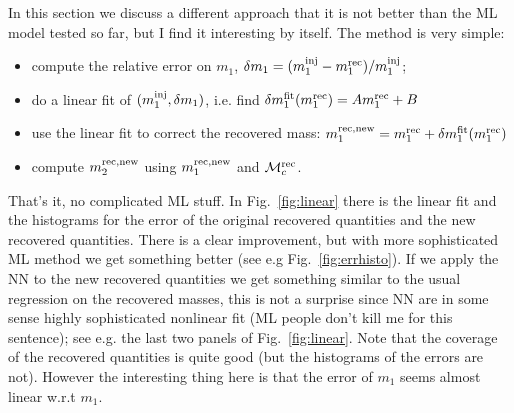 \documentclass[prd,aps,twocolumn,a4paper,showkeys,nofootinbib]{revtex4-1}
\def\Mc{{\cal M}_c}
\begin{document}
In this section we discuss a different approach that it is not better than the ML
model tested so far, but I find it interesting by itself. 
The method is very simple: 
\begin{itemize}
\item compute the relative error on $m_1$, 
$\delta m_1 = (m_1^{\rm inj}-m_1^{\rm rec})/m_1^{\rm inj}$;
\item do a linear fit of $(m_1^{\rm inj}, \delta m_1)$, i.e. find
$\delta m_1^{\rm fit}(m_1^{\rm rec}) = A m_1^{\rm rec} + B$
\item use the linear fit to correct the recovered mass: 
$m_1^{\rm rec, new} = m_1^{\rm rec} + \delta m_1^{\rm fit}(m_1^{\rm rec})$
\item compute $m_2^{\rm rec, new}$ using $m_1^{\rm rec, new}$ and $\Mc^{\rm rec}$. 
\end{itemize} 
That's it, no complicated ML stuff. 
In Fig.~\ref{fig:linear} there is the linear fit and the histograms for 
the error of the original recovered quantities and the new recovered quantities. There 
is a clear improvement, but with more sophisticated ML method we get something better 
(see e.g Fig.~\ref{fig:errhisto}).
If we apply the NN to the new recovered quantities we get something similar 
to the usual regression on the recovered masses, this is not a surprise
since NN are in some sense highly sophisticated nonlinear fit (ML people don't kill me
for this sentence); see e.g. the last two panels of Fig.~\ref{fig:linear}.
Note that the coverage of the recovered quantities is quite good (but the histograms 
of the errors are not).
However the interesting thing here is that the error of $m_1$ seems almost linear w.r.t $m_1$.
\end{document}
